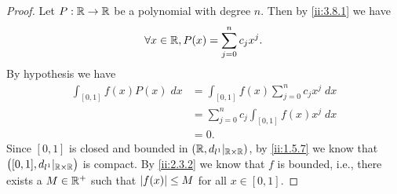 \begin{proof}
  Let \(P : \mathbb{R} \to \mathbb{R}\) be a polynomial with degree \(n\).
  Then by \cref{ii:3.8.1} we have
  \[
    \forall x \in \mathbb{R}, P(x) = \sum_{j = 0}^n c_j x^j.
  \]
  By hypothesis we have
  \begin{align*}
    \int_{[0, 1]} f(x) P(x) \; dx & = \int_{[0, 1]} f(x) \sum_{j = 0}^n c_j x^j \; dx \\
                                  & = \sum_{j = 0}^n c_j \int_{[0, 1]} f(x) x^j \; dx \\
                                  & = 0.
  \end{align*}
  Since \([0, 1]\) is closed and bounded in \((\mathbb{R}, d_{l^1}|_{\mathbb{R} \times \mathbb{R}})\), by \cref{ii:1.5.7} we know that \(\big([0, 1], d_{l^1}|_{\mathbb{R} \times \mathbb{R}}\big)\) is compact.
  By \cref{ii:2.3.2} we know that \(f\) is bounded, i.e., there exists a \(M \in \mathbb{R}^+\) such that \(\left\lvert f(x)\right\rvert \leq M\) for all \(x \in [0, 1]\).


\end{proof}
